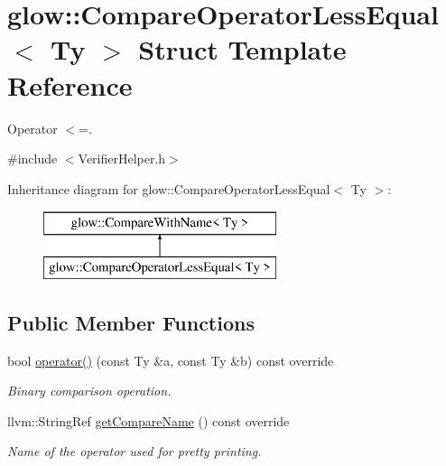 \hypertarget{structglow_1_1_compare_operator_less_equal}{}\section{glow\+:\+:Compare\+Operator\+Less\+Equal$<$ Ty $>$ Struct Template Reference}
\label{structglow_1_1_compare_operator_less_equal}


Operator $<$=.  




{\ttfamily \#include $<$Verifier\+Helper.\+h$>$}

Inheritance diagram for glow\+:\+:Compare\+Operator\+Less\+Equal$<$ Ty $>$\+:\begin{figure}[H]
\begin{center}
\leavevmode
\includegraphics[height=2.000000cm]{structglow_1_1_compare_operator_less_equal}
\end{center}
\end{figure}
\subsection*{Public Member Functions}
\begin{DoxyCompactItemize}
\item 
\mbox{\label{structglow_1_1_compare_operator_less_equal_a9f1e8e0d34ff364b91f0cd88120585a5}} 
bool \hyperlink{structglow_1_1_compare_operator_less_equal_a9f1e8e0d34ff364b91f0cd88120585a5}{operator()} (const Ty \&a, const Ty \&b) const override
\begin{DoxyCompactList}\small\item\em Binary comparison operation. \end{DoxyCompactList}\item 
\mbox{\label{structglow_1_1_compare_operator_less_equal_ae05c71b678a65f797bbe212cb0173094}} 
llvm\+::\+String\+Ref \hyperlink{structglow_1_1_compare_operator_less_equal_ae05c71b678a65f797bbe212cb0173094}{get\+Compare\+Name} () const override
\begin{DoxyCompactList}\small\item\em Name of the operator used for pretty printing. \end{DoxyCompactList}\end{DoxyCompactItemize}


